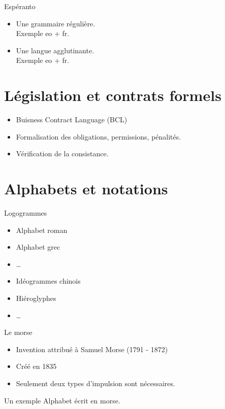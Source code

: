 \documentclass{beamer}
\begin{document}
\begin{frame}
\begin{center}
\huge Espéranto
\end{center}
\begin{itemize}
\item Une grammaire régulière.
\\ Exemple eo + fr.
\item Une langue agglutinante.
\\ Exemple eo + fr.
\end{itemize}
\end{frame}

\section[Contrats]{Législation et contrats formels}

\begin{frame}  
  \begin{itemize}
  \item Buisness Contract Language (BCL)%
  \item Formalisation des obligations, permissions, pénalités.%
  \item Vérification de la consistance.
  \end{itemize}
\end{frame}

\section[Alphabets]{Alphabets et notations}

\begin{frame}
  {\Huge Logogrammes}
  \begin{itemize}
  \item Alphabet roman
  \item Alphabet grec
  \item \dots
  \end{itemize}
  \begin{itemize}
  \item Idéogrammes chinois
  \item Hiéroglyphes
  \item \dots
  \end{itemize}
\end{frame}

\begin{frame}
  {\Huge Le morse}
  \begin{itemize}
  \item Invention attribué à Samuel Morse (1791 - 1872)
  \item Créé en 1835
  \item Seulement deux types d'impulsion sont nécessaires.
  \end{itemize}
  
  Un exemple Alphabet écrit en morse.
\end{frame}
\end{document}
